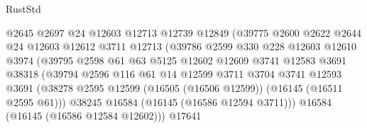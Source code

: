 \begin{lexlean}{RustStd}
\begin{coremodule}
                                  @2645
                                  @2697
                                  @24
                                  @12603
                                  @12713
                                  @12739
                                  @12849
                                  (@39775
                                    @2600
                                    @2622
                                    @2644
                                    @24
                                    @12603
                                    @12612
                                    @3711
                                    @12713
                                    (@39786
                                      @2599
                                      @330
                                      @228
                                      @12603
                                      @12610
                                      @3974
                                      (@39795
                                        @2598
                                        @61
                                        @63
                                        @5125
                                        @12602
                                        @12609
                                        @3741
                                        @12583
                                        @3691
                                        @38318
                                        (@39794
                                          @2596
                                          @116
                                          @61
                                          @14
                                          @12599
                                          @3711
                                          @3704
                                          @3741
                                          @12593
                                          @3691
                                          (@38278
                                            @2595
                                            @12599
                                            (@16505 (@16506 @12599))
                                            (@16145 (@16511 @2595 @61)))
                                          @38245
                                          @16584
                                          (@16145 (@16586 @12594 @3711)))
                                        @16584
                                        (@16145 (@16586 @12584 @12602)))
                                      @17641

\end{coremodule}
\end{lexlean}
